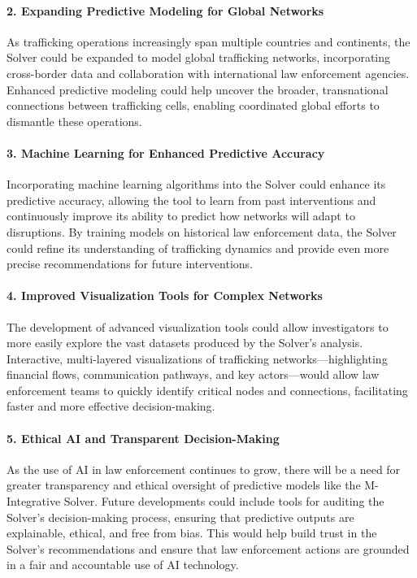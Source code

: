 \documentclass[%
 preprint, linenumbers,
 amsmath,amssymb,
 aps, physrev,
]{revtex4-2}
\begin{document}
\paragraph{2. Expanding Predictive Modeling for Global Networks}
As trafficking operations increasingly span multiple countries and continents, the Solver could be expanded to model global trafficking networks, incorporating cross-border data and collaboration with international law enforcement agencies. Enhanced predictive modeling could help uncover the broader, transnational connections between trafficking cells, enabling coordinated global efforts to dismantle these operations.

\paragraph{3. Machine Learning for Enhanced Predictive Accuracy}
Incorporating machine learning algorithms into the Solver could enhance its predictive accuracy, allowing the tool to learn from past interventions and continuously improve its ability to predict how networks will adapt to disruptions. By training models on historical law enforcement data, the Solver could refine its understanding of trafficking dynamics and provide even more precise recommendations for future interventions.

\paragraph{4. Improved Visualization Tools for Complex Networks}
The development of advanced visualization tools could allow investigators to more easily explore the vast datasets produced by the Solver’s analysis. Interactive, multi-layered visualizations of trafficking networks—highlighting financial flows, communication pathways, and key actors—would allow law enforcement teams to quickly identify critical nodes and connections, facilitating faster and more effective decision-making.

\paragraph{5. Ethical AI and Transparent Decision-Making}
As the use of AI in law enforcement continues to grow, there will be a need for greater transparency and ethical oversight of predictive models like the M-Integrative Solver. Future developments could include tools for auditing the Solver’s decision-making process, ensuring that predictive outputs are explainable, ethical, and free from bias. This would help build trust in the Solver’s recommendations and ensure that law enforcement actions are grounded in a fair and accountable use of AI technology.
\end{document}
